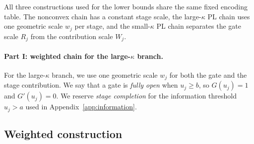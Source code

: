 \documentclass{article}
\theoremstyle{definition}
\begin{document}
All three constructions used for the lower bounds share the same fixed encoding table.  The
nonconvex chain has a constant stage scale, the large-$\kappa$ PL chain uses one
geometric scale $w_j$ per stage, and the small-$\kappa$ PL chain separates the
gate scale $R_j$ from the contribution scale $W_j$.

\paragraph{Part I: weighted chain for the large-$\kappa$ branch.}
For the large-$\kappa$ branch, we use one geometric scale $w_j$ for both the gate and
the stage contribution.  We say that a gate is \emph{fully open} when
$u_j\ge b$, so $G(u_j)=1$ and $G'(u_j)=0$.  We reserve \emph{stage completion}
for the information threshold $u_j>a$ used in
Appendix~\ref{app:information}.

\subsection{Weighted construction}
\end{document}
